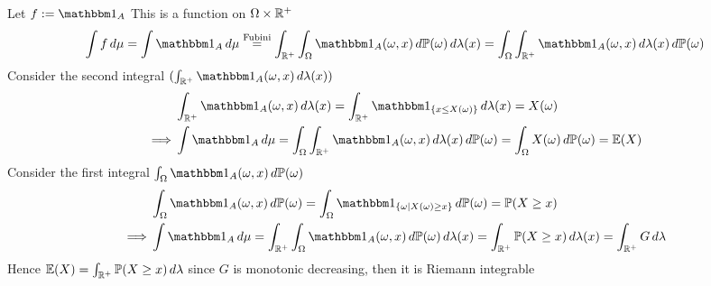 Let $f := \I_A$ This is a function on $\Omega \times \mathbb{R}^+$\begin{equation*}
    \int f \diff \mu = \int \I_A \diff \mu \stackrel{\text{Fubini}}{=} \int_{\R^+}\into \I_A(\omega,x) \diff\prob(\omega) \diff\lambda(x) = \into\int_{\R^+} \I_A(\omega,x)  \diff\lambda(x)\diff\prob(\omega)
\end{equation*}
Consider the second integral $(\int_{\R^+} \I_A(\omega,x)  \diff\lambda(x))$
\begin{align*}
    &\int_{\R^+} \I_A(\omega,x)  \diff\lambda(x) = \int_{\R^+} \I_{\{x\leq X(\omega)\}}  \diff\lambda(x) = X(\omega) \\
    \implies& \int \I_A \diff \mu =\into\int_{\R^+} \I_A(\omega,x)  \diff\lambda(x)\diff\prob(\omega)= \into X(\omega) \diff\prob(\omega) = \E(X)
\end{align*}
Consider the first integral $\into \I_A(\omega,x) \diff\prob(\omega)$
\begin{align*}
    &\into \I_A(\omega,x) \diff\prob(\omega) = \into \I_{\{\omega|X(\omega) \geq x\}} \diff\prob(\omega) = \prob(X\geq x) \\
    \implies& \int \I_A \diff \mu =\int_{\R^+}\into \I_A(\omega,x) \diff\prob(\omega) \diff\lambda(x) = \int_{\R^+} \prob(X\geq x)\diff\lambda(x) = \int_{\R^+} G \diff\lambda
\end{align*}
Hence $\mathbb{E}(X) = \int_{\mathbb{R}^+} \mathbb{P}(X\geq x) \mathop{}\!d\lambda$ since $G$ is monotonic decreasing, then it is Riemann integrable 

\newpage
